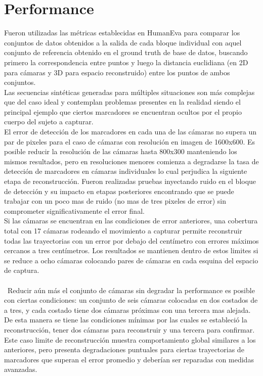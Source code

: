 \section{Performance}

Fueron utilizadas las métricas establecidas en HumanEva \cite{humaneva} para comparar los conjuntos de datos obtenidos a la salida de cada bloque individual con aquel conjunto de referencia obtenido en el ground truth de base de datos, buscando primero la correspondencia entre puntos y luego la distancia euclidiana (en 2D para cámaras y 3D para espacio reconstruido) entre los puntos de ambos conjuntos.
\\

Las secuencias sintéticas generadas para múltiples situaciones son más complejas que del caso ideal y contemplan problemas presentes en la realidad siendo el principal ejemplo que ciertos marcadores se encuentran ocultos por el propio cuerpo del sujeto a capturar. 
\\

El error de detección de los marcadores en cada una de las cámaras no supera un par de pixeles para el caso de cámaras con resolución en imagen de 1600x600. Es posible reducir la resolución de las cámaras hasta 800x300 manteniendo los mismos resultados, pero en resoluciones menores comienza a degradarse la tasa de detección de marcadores en cámaras individuales lo cual perjudica la siguiente etapa de reconstrucción. Fueron realizadas pruebas inyectando ruido en el bloque de detección y su impacto en etapas posteriores encontrando que se puede trabajar con un poco mas de ruido (no mas de tres pixeles de error) sin comprometer significativamente el error final.
\\

Si las cámaras se encuentran en las condiciones de error anteriores, una cobertura total con 17 cámaras rodeando el movimiento a capturar permite reconstruir todas las trayectorias con un error por debajo del centímetro con errores máximos cercanos a tres centímetros. Los resultados se mantienen dentro de estos limites si se reduce a ocho cámaras colocando pares de cámaras en cada esquina del espacio de captura. \\\\\
Reducir aún más el conjunto de cámaras sin degradar la performance es posible con ciertas condiciones: un conjunto de seis cámaras colocadas en dos costados de a tres, y cada costado tiene dos cámaras próximas con una tercera mas alejada. De esta manera se tiene las condiciones mínimas por las cuales se estableció la reconstrucción, tener dos cámaras para reconstruir y una tercera para confirmar.
\\

Este caso limite de reconstrucción muestra comportamiento global similares a los anteriores, pero presenta degradaciones puntuales para ciertas trayectorias de marcadores que superan el error promedio y deberían ser reparadas con medidas avanzadas.

